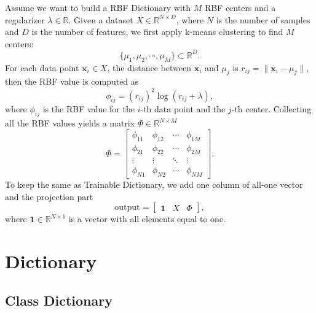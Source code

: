 \documentclass[en, bibend=bibtex]{elegantpaper}
\theoremstyle{plain}
\begin{document}
Assume we want to build a RBF Dictionary
with $M$ RBF centers and a regularizer $\lambda \in \mathbb{R}$.
Given a dataset $X \in \mathbb{R}^{N \times D}$,
where $N$ is the number of samples and
$D$ is the number of features,
we first apply k-means clustering to find $M$ centers:
\begin{equation*}
  \{\mu_1, \mu_2, \cdots, \mu_M\} \subset \mathbb{R}^D.
\end{equation*}
For each data point $\mathbf{x}_i \in X$,
the distance between $\mathbf{x}_i$ and $\mu_j$ is
$r_{ij} = \|\mathbf{x}_i - \mu_j\|$,
then the RBF value is computed as
\begin{equation*}
  \phi_{ij} = (r_{ij})^2 \log(r_{ij} + \lambda),
\end{equation*}
where $\phi_{ij}$ is the RBF value for the
$i$-th data point and the $j$-th center.
Collecting all the RBF values yields a matrix $\Phi \in \mathbb{R}^{N \times M}$
\begin{equation*}
  \Phi = \left[
    \begin{array}{cccc}
      \phi_{11}&\phi_{12}&\cdots&\phi_{1M}\\
      \phi_{21}&\phi_{22}&\cdots&\phi_{2M}\\
      \vdots & \vdots & \ddots & \vdots\\
      \phi_{N1}&\phi_{N2}&\cdots&\phi_{NM}
    \end{array}
  \right].
\end{equation*}
To keep the same as Trainable Dictionary,
we add one column of all-one vector and
the projection part
\begin{equation*}
  \text{output} = \left[
    \begin{array}{ccc}
      \mathbf{1}&X&\Phi
    \end{array}
  \right],
\end{equation*}
where $\mathbf{1} \in \mathbb{R}^{N\times 1}$ is a vector with all elements
equal to one.


\section{Dictionary}

\subsection{Class Dictionary}
\end{document}
